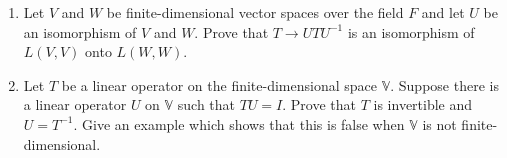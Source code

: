 \begin{enumerate}[label=\thesubsection.\arabic*.,ref=\thesubsection.\theenumi]
\begin{enumerate}
\end{enumerate}
\item Let $V$ and $W$ be finite-dimensional vector spaces over the field $F$ and let $U$ be an isomorphism of $V$ and $W$. Prove that $T \rightarrow UTU^{-1}$ is an isomorphism of $L(V,V)$ onto $L(W,W)$.
%
\\
\solution

%
\item Let $T$ be a linear operator on the finite-dimensional space $\mathbb{V}$. Suppose there is a linear operator $U$ on $\mathbb{V}$ such that $TU = I$. Prove that $T$ is invertible and $U = T^{-1}$. Give an example which shows that this is false when $\mathbb{V}$ is not finite-dimensional.
%
\\
\solution

\end{enumerate}
